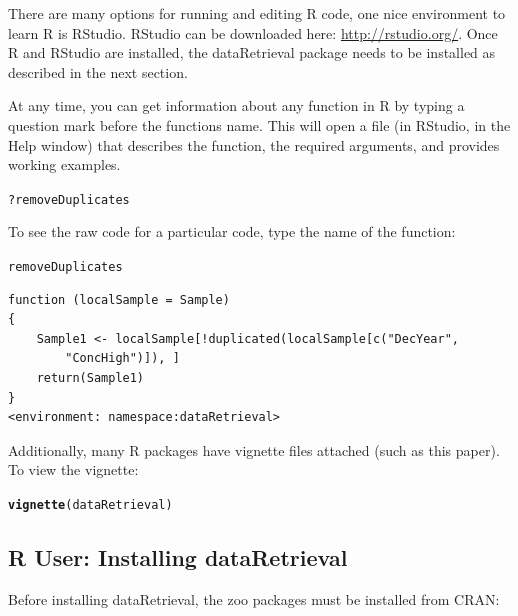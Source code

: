 \documentclass[a4paper,11pt]{article}\usepackage[]{graphicx}\usepackage[]{color}
\makeatletter
\newcommand{\hlopt}[1]{\textcolor[rgb]{0,0,0}{#1}}%
\newcommand{\hlstd}[1]{\textcolor[rgb]{0.345,0.345,0.345}{#1}}%
\newcommand{\hlkwd}[1]{\textcolor[rgb]{0.737,0.353,0.396}{\textbf{#1}}}%
\newenvironment{kframe}{%
 \def\at@end@of@kframe{}%
 \ifinner\ifhmode%
  \def\at@end@of@kframe{\end{minipage}}%
  \begin{minipage}{\columnwidth}%
 \fi\fi%
 \def\FrameCommand##1{\hskip\@totalleftmargin \hskip-\fboxsep
 \colorbox{shadecolor}{##1}\hskip-\fboxsep
     \hskip-\linewidth \hskip-\@totalleftmargin \hskip\columnwidth}%
 \MakeFramed {\advance\hsize-\width
   \@totalleftmargin\z@ \linewidth\hsize
   \@setminipage}}%
 {\par\unskip\endMakeFramed%
 \at@end@of@kframe}
\newenvironment{knitrout}{}{} %
\makeatother
\begin{document}
There are many options for running and editing R code, one nice environment to learn R is RStudio. RStudio can be downloaded here: \url{http://rstudio.org/}. Once R and RStudio are installed, the dataRetrieval package needs to be installed as described in the next section.

At any time, you can get information about any function in R by typing a question mark before the functions name.  This will open a file (in RStudio, in the Help window) that describes the function, the required arguments, and provides working examples.

\begin{knitrout}
\color{fgcolor}\begin{kframe}
\begin{alltt}
\hlopt{?}\hlstd{removeDuplicates}
\end{alltt}
\end{kframe}
\end{knitrout}


To see the raw code for a particular code, type the name of the function:
\begin{knitrout}
\color{fgcolor}\begin{kframe}
\begin{alltt}
\hlstd{removeDuplicates}
\end{alltt}
\begin{verbatim}
function (localSample = Sample) 
{
    Sample1 <- localSample[!duplicated(localSample[c("DecYear", 
        "ConcHigh")]), ]
    return(Sample1)
}
<environment: namespace:dataRetrieval>
\end{verbatim}
\end{kframe}
\end{knitrout}


Additionally, many R packages have vignette files attached (such as this paper). To view the vignette:
\begin{knitrout}
\color{fgcolor}\begin{kframe}
\begin{alltt}
\hlkwd{vignette}\hlstd{(dataRetrieval)}
\end{alltt}
\end{kframe}
\end{knitrout}



\subsection{R User: Installing dataRetrieval}
Before installing dataRetrieval, the zoo packages must be installed from CRAN:
\end{document}
